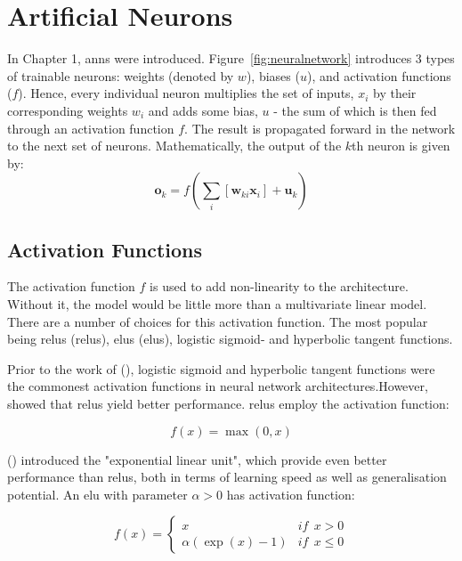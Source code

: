 \documentclass[11pt,oneside,openany,a4paper,english, report, goldenblock
]{usthesis}
\begin{document}
\section{Artificial Neurons}
\label{section:artificial_neurons}

In Chapter 1, \acrshort{ann}s were introduced. Figure~\ref{fig:neuralnetwork} introduces 3 types of trainable neurons: weights (denoted by $w$), biases ($u$), and activation functions ($f$). Hence, every individual neuron multiplies the set of inputs, $x_i$ by their corresponding weights $w_i$ and adds some bias, $u$ - the sum of which is then fed through an activation function $f$. The result is propagated forward in the network to the next set of neurons. Mathematically, the output of the $k$th neuron is given by:
\begin{equation}
\mathbf{o}_k = f\left(\sum_i \left[ \mathbf{w}_{ki} \mathbf{x}_i \right] + \mathbf{u}_k\right)
\end{equation}

\subsection{Activation Functions}
The activation function $f$ is used to add non-linearity to the architecture. Without it, the model would be little more than a multivariate linear model. There are a number of choices for this activation function. The most popular being \acrlong{relu}s (\acrshort{relu}s), \acrlong{elu}s (\acrshort{elu}s), logistic sigmoid- and hyperbolic tangent functions.

Prior to the work of  (\citeyear{glorot2011deep}), logistic sigmoid and hyperbolic tangent functions were the commonest activation functions in neural network architectures.However, \citet{glorot2011deep} showed that \acrshort{relu}s yield better performance. \acrshort{relu}s employ the activation function:

\begin{equation}
f\left(x\right) = \max\left(0, x\right)
\end{equation}

 (\citeyear{DBLP:journals/corr/ClevertUH15}) introduced the "exponential linear unit", which provide even better performance than \acrshort{relu}s, both in terms of learning speed as well as generalisation potential. An \acrshort{elu} with parameter $\alpha > 0$ has activation function:

\begin{equation}
f\left(x\right)=\left\{\begin{matrix}
x & if\ \ x > 0\\ 
\alpha \left( \exp\left(x \right ) -1\right ) & if\ \ x \leq 0
\end{matrix}\right.
\end{equation}
\end{document}
